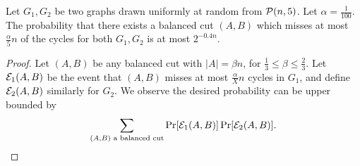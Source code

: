 \begin{lem}\label{chap5-lem:two-packing}
    Let $G_1, G_2$ be two graphs drawn uniformly at random from $\mathcal{P}(n,5)$. Let $\alpha = \frac{1}{100}$. The probability that there exists a balanced cut $(A,B)$ which misses at most $ \frac{\alpha}{5}n$ of the cycles for both $G_1, G_2$ is at most $2^{-0.4n}$.
\end{lem}
\begin{proof}
Let $(A,B)$ be any balanced cut with $|A| = \beta n$, for $\frac{1}{3} \leq \beta \leq \frac{2}{3}$. Let $\mathcal{E}_1(A,B)$ be the event that $(A,B)$ misses at most $\frac{\alpha}{X}n$ cycles in $G_1$, and define $\mathcal{E}_2(A,B)$ similarly for $G_2$. We observe the desired probability can be upper bounded by
\begin{equation}\label{chap5-eq:total-prob}
    \sum_{\substack{(A,B) \text{ a balanced cut}}} \Pr[\mathcal{E}_1(A,B)] \Pr[\mathcal{E}_2(A,B)].
\end{equation}


\end{proof}
